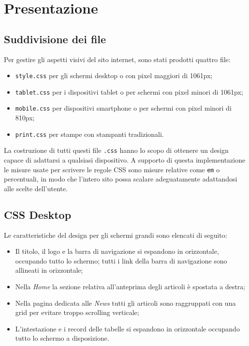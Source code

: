 \section{Presentazione}
\label{Presentazione}
    \subsection{Suddivisione dei file}
    Per gestire gli aspetti visivi del sito internet, sono stati prodotti quattro file:
    \begin{itemize}
        \item \texttt{style.css} per gli schermi desktop o con pixel maggiori di 1061px;
        \item \texttt{tablet.css} per i dispositivi tablet o per schermi con pixel minori di 1061px;
        \item \texttt{mobile.css} per dispositivi smartphone o per schermi con pixel minori di 810px;
        \item \texttt{print.css} per stampe con stampanti tradizionali.
    \end{itemize}
    La costruzione di tutti questi file \texttt{.css} hanno lo scopo di ottenere un design capace di adattarsi a qualsiasi dispositivo. A supporto di questa implementazione le misure usate per scrivere le regole CSS sono misure relative come \texttt{em} o percentuali, in modo che l'intero sito possa scalare adeguatamente adattandosi alle scelte dell'utente.
    
    \subsection{CSS Desktop}
    Le caratteristiche del design per gli schermi grandi sono elencati di seguito:
    \begin{itemize}
        \item Il titolo, il logo e la barra di navigazione si espandono in orizzontale, occupando tutto lo schermo; tutti i link della barra di navigazione sono allineati in orizzontale;
        \item Nella \textit{Home} la sezione relativa all'anteprima degli articoli è spostata a destra;
        \item Nella pagina dedicata alle \textit{News} tutti gli articoli sono raggruppati con una grid per evitare troppo scrolling verticale;
        \item L'intestazione e i record delle tabelle si espandono in orizzontale occupando tutto lo schermo a disposizione.
    \end{itemize}
    
